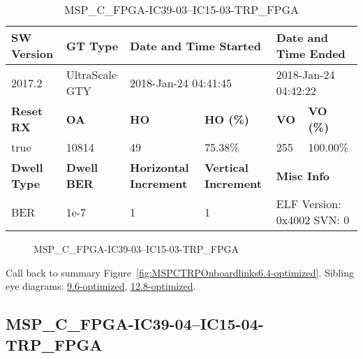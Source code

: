 \begin{table}[h]
\centering
\caption{MSP\_C\_FPGA-IC39-03--IC15-03-TRP\_FPGA}
\label{tab:MSPCFPGAIC3903IC1503TRPFPGA6.4-optimized}
\begin{tabular}{@{}|l|l|l|l|l|l|@{}}
\toprule
\textbf{SW Version}                & \textbf{GT Type}   & \multicolumn{2}{l|}{\textbf{Date and Time Started}}            & \multicolumn{2}{l|}{\textbf{Date and Time Ended}}        \\ \midrule
2017.2                       & UltraScale GTY          & \multicolumn{2}{l|}{2018-Jan-24 04:41:45}                   & \multicolumn{2}{l|}{2018-Jan-24 04:42:22}               \\ \midrule
\textbf{Reset RX}                  & \textbf{OA} & \textbf{HO}   & \textbf{HO (\%)} & \textbf{VO} & \textbf{VO (\%)} \\ \midrule
true & 10814        & 49          & 75.38\%        & 255        & 100.00\%       \\ \midrule
\textbf{Dwell Type}                & \textbf{Dwell BER} & \textbf{Horizontal Increment} & \textbf{Vertical Increment}    & \multicolumn{2}{l|}{\textbf{Misc Info}}                  \\ \midrule
BER                            & 1e-7        & 1        & 1           & \multicolumn{2}{l|}{ELF Version: 0x4002 SVN: 0}                         \\ \bottomrule
\end{tabular}
\end{table}

\begin{figure}[h]
\caption{MSP\_C\_FPGA-IC39-03--IC15-03-TRP\_FPGA} \label{fig:MSPCFPGAIC3903IC1503TRPFPGA6.4-optimized}
\end{figure}

Call back to summary Figure~\ref{fig:MSPCTRPOnboardlinks6.4-optimized}.
Sibling eye diagrams: \hyperref[sec:MSPCFPGAIC3903IC1503TRPFPGA9.6-optimized]{9.6-optimized}, \hyperref[sec:MSPCFPGAIC3903IC1503TRPFPGA12.8-optimized]{12.8-optimized}.

\clearpage
\newpage


\subsection{MSP\_C\_FPGA-IC39-04--IC15-04-TRP\_FPGA}\label{sec:MSPCFPGAIC3904IC1504TRPFPGA6.4-optimized}


